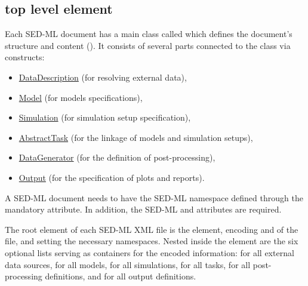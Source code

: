 \subsection{ top level element}
\label{class:sed-ml}
Each SED-ML \currentLV document has a main class called  which defines the document's structure and content (). It consists of several parts connected to the  class via \hyperref[sec:listOf]{} constructs: 
\begin{itemize}
	\item \hyperref[class:dataDescription]{DataDescription} (for resolving external data), 
	\item \hyperref[class:model]{Model} (for models specifications),
	\item \hyperref[class:simulation]{Simulation} (for simulation setup specification), 
	\item \hyperref[class:abstractTask]{AbstractTask} (for the linkage of models and simulation setups), 
	\item \hyperref[class:dataGenerator]{DataGenerator} (for the definition of post-processing),
	\item \hyperref[class:output]{Output} (for the specification of plots and reports).
\end{itemize}

A SED-ML document needs to have the SED-ML namespace defined through the mandatory \hyperref[sec:xmlns]{} attribute. In addition, the SED-ML \hyperref[sec:level]{} and \hyperref[sec:version]{} attributes are required.

The root element of each SED-ML XML file is the  element, encoding \hyperref[sec:level]{} and \hyperref[sec:version]{} of the file, and setting the necessary namespaces. Nested inside the  element are the six optional lists serving as containers for the encoded information: \hyperref[sec:listOfDataDescriptions]{} for all external data sources, \hyperref[sec:listOfModels]{} for all models, \hyperref[sec:listOfSimulations]{} for all simulations, \hyperref[sec:listOfTasks]{} for all tasks, \hyperref[sec:listOfDataGenerators]{} for all post-processing definitions, and \hyperref[sec:listOfOutputs]{} for all output definitions.

